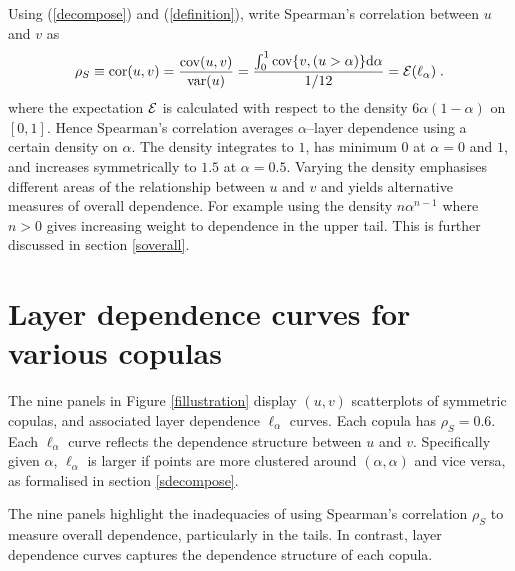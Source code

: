 \documentclass[authoryear]{elsarticle}
\newcommand{\var}{{\rm var}}
\newcommand{\cov}{{\rm cov}}
\newcommand{\E}{{\mathrm E}}
\newcommand{\Ex}{{\cal E}}
\newcommand{\cor}{\mathrm{cor}}
\newcommand{\de}{\mathrm{d}}
\newcommand{\cq}{\ ,\quad }
\newcommand{\eref}[1]{(\ref{#1})}
\newcommand{\fref}[1]{Figure \ref{#1}}
\newcommand{\aref}[1]{\ref{#1}}
\begin{document}
Using \eref{decompose} and \eref{definition}, write Spearman's correlation between $u$ and $v$ as
\begin{equation}\label{wtdaverage}
\rho_S\equiv \cor(u,v) =\frac{\cov(u,v)}{\var(u)}=\frac{\int _0^1\cov\{v,(u>\alpha)\}\de\alpha}{1/12}
=\Ex(\ell_\alpha)\; .
\end{equation}
where the expectation $\Ex$ is calculated with respect to the density $6\alpha(1-\alpha)$ on $[0,1]$. Hence Spearman's correlation averages $\alpha$--layer dependence using a certain density on $\alpha$. The density integrates to $1$, has minimum $0$ at $\alpha=0$ and $1$, and increases symmetrically to $1.5$ at $\alpha=0.5$. Varying the density emphasises different areas of the relationship between $u$ and $v$ and yields alternative measures of overall dependence. For example using the density $n\alpha^{n-1}$ where $n>0$ gives increasing weight to dependence in the upper tail. This is further discussed in section \aref{soverall}.

\section{Layer dependence curves for various copulas}\label{sldcurve}

The nine panels in \fref{fillustration} display $(u,v)$ scatterplots of symmetric copulas, and associated layer dependence $\ell_\alpha$ curves. Each copula has $\rho_S=0.6$. Each $\ell_\alpha$ curve reflects the dependence structure between $u$ and $v$. Specifically given $\alpha$, $\ell_\alpha$ is larger if points are more clustered around $(\alpha,\alpha)$ and vice versa, as formalised in section \aref{sdecompose}.

The nine panels  highlight the inadequacies of using Spearman's correlation $\rho_S$ to measure overall dependence, particularly in the tails. In contrast, layer dependence curves captures the dependence structure of each copula.
\end{document}
